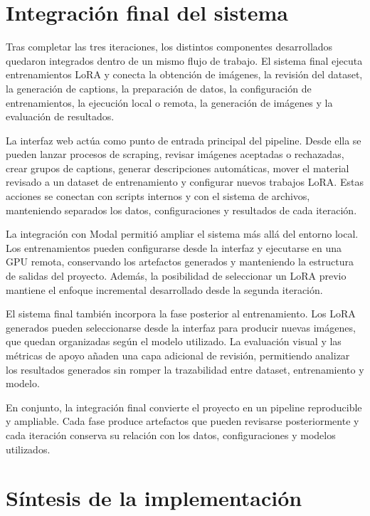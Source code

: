 \documentclass[a4paper,11pt,titlepage]{scrbook}
\begin{document}
\section{Integración final del sistema}

Tras completar las tres iteraciones, los distintos componentes desarrollados quedaron integrados dentro de un mismo flujo de trabajo. El sistema final ejecuta entrenamientos LoRA y conecta la obtención de imágenes, la revisión del dataset, la generación de captions, la preparación de datos, la configuración de entrenamientos, la ejecución local o remota, la generación de imágenes y la evaluación de resultados.

\medskip

La interfaz web actúa como punto de entrada principal del pipeline. Desde ella se pueden lanzar procesos de scraping, revisar imágenes aceptadas o rechazadas, crear grupos de captions, generar descripciones automáticas, mover el material revisado a un dataset de entrenamiento y configurar nuevos trabajos LoRA. Estas acciones se conectan con scripts internos y con el sistema de archivos, manteniendo separados los datos, configuraciones y resultados de cada iteración.

\medskip

La integración con Modal permitió ampliar el sistema más allá del entorno local. Los entrenamientos pueden configurarse desde la interfaz y ejecutarse en una GPU remota, conservando los artefactos generados y manteniendo la estructura de salidas del proyecto. Además, la posibilidad de seleccionar un LoRA previo mantiene el enfoque incremental desarrollado desde la segunda iteración.

\medskip

El sistema final también incorpora la fase posterior al entrenamiento. Los LoRA generados pueden seleccionarse desde la interfaz para producir nuevas imágenes, que quedan organizadas según el modelo utilizado. La evaluación visual y las métricas de apoyo añaden una capa adicional de revisión, permitiendo analizar los resultados generados sin romper la trazabilidad entre dataset, entrenamiento y modelo.

\medskip

En conjunto, la integración final convierte el proyecto en un pipeline reproducible y ampliable. Cada fase produce artefactos que pueden revisarse posteriormente y cada iteración conserva su relación con los datos, configuraciones y modelos utilizados.

\section{Síntesis de la implementación}
\end{document}
